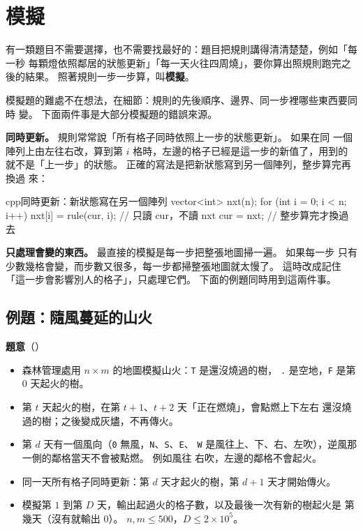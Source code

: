 \section{模擬}
\label{sec:simulation}

有一類題目不需要選擇，也不需要找最好的：題目把規則講得清清楚楚，例如「每一秒
每顆燈依照鄰居的狀態更新」「每一天火往四周燒」，要你算出照規則跑完之後的結果。
照著規則一步一步算，叫\textbf{模擬}。

模擬題的難處不在想法，在細節：規則的先後順序、邊界、同一步裡哪些東西要同時
變。 下面兩件事是大部分模擬題的錯誤來源。

\textbf{同時更新。} 規則常常說「所有格子同時依照上一步的狀態更新」。 如果在同
一個陣列上由左往右改，算到第 $i$ 格時，左邊的格子已經是這一步的新值了，用到的
就不是「上一步」的狀態。 正確的寫法是把新狀態寫到另一個陣列，整步算完再換過
來：

\begin{code}{cpp}{同時更新：新狀態寫在另一個陣列}
vector<int> nxt(n);
for (int i = 0; i < n; i++) {
    nxt[i] = rule(cur, i);   // 只讀 cur，不讀 nxt
}
cur = nxt;                   // 整步算完才換過去
\end{code}

\textbf{只處理會變的東西。} 最直接的模擬是每一步把整張地圖掃一遍。 如果每一步
只有少數幾格會變，而步數又很多，每一步都掃整張地圖就太慢了。 這時改成記住
「這一步會影響別人的格子」，只處理它們。 下面的例題同時用到這兩件事。

\subsection{例題：隨風蔓延的山火}
\label{sec:ex-fire}

\textbf{題意}（）

\begin{itemize}
\item 森林管理處用 $n \times m$ 的地圖模擬山火：\texttt{T} 是還沒燒過的樹，
\texttt{.} 是空地，\texttt{F} 是第 $0$ 天起火的樹。
\item 第 $t$ 天起火的樹，在第 $t + 1$、$t + 2$ 天「正在燃燒」，會點燃上下左右
還沒燒過的樹；之後變成灰燼，不再傳火。
\item 第 $d$ 天有一個風向（\texttt{0} 無風，\texttt{N}、\texttt{S}、\texttt{E}、
\texttt{W} 是風往上、下、右、左吹），逆風那一側的鄰格當天不會被點燃。 例如風往
右吹，左邊的鄰格不會起火。
\item 同一天所有格子同時更新：第 $d$ 天才起火的樹，第 $d + 1$ 天才開始傳火。
\item 模擬第 $1$ 到第 $D$ 天，輸出起過火的格子數，以及最後一次有新的樹起火是
第幾天（沒有就輸出 $0$）。 $n, m \le 500$，$D \le 2 \times 10^5$。
\end{itemize}

